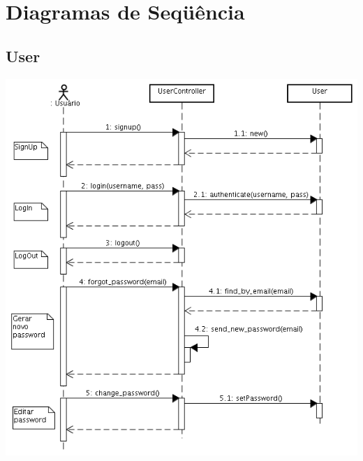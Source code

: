 \documentclass[11pt]{article}
\begin{document}
\pagebreak


\section{Diagramas de Seqüência}

\subsection{User}
\includegraphics[width=150truemm]{seq_user.png}
\end{document}
